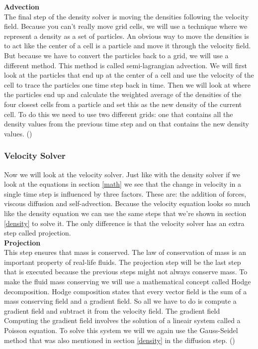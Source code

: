 \documentclass[a4paper,12pt]{article}
\begin{document}
\textbf{Advection }\\

The final step of the density solver is moving the densities following the velocity field.
Because you can't really move grid cells, we will use a technique where we represent a density as a set of particles.
An obvious way to move the densities is to act like the center of a cell is a particle and move it through the velocity field.
But because we have to convert the particles back to a grid, we will use a different method. 
This method is called semi-lagrangian advection.
We will first look at the particles that end up at the center of a cell and use the velocity of the cell to trace the particles one time step back in time.
Then we will look at where the particles end up and calculate the weighted average of the densities of the four closest cells from a particle and set this as the new density of the current cell. 
To do this we need to use two different grids: one that contains all the density values from the previous time step
and on that contains the new density values. (\cite{josstam})

 \subsubsection{Velocity Solver}
Now we will look at the velocity solver. Just like with the density solver if we look at the equations in section \ref{math}
we see that the change in velocity in a single time step is influenced by three factors. 
These are: the addition of forces, viscous diffusion and self-advection. 
Because the velocity equation looks so much like the density equation we can use the same steps that we're shown in section \ref{density} to solve it.
The only difference is that the velocity solver has an extra step called projection. \\

\textbf{Projection }\\

This step ensures that mass is conserved. 
The law of conservation of mass is an important property of real-life fluids.
The projection step will be the last step that is executed because the previous steps might not always conserve mass.
To make the fluid mass conserving we will use a mathematical concept called Hodge decomposition.
Hodge composition states that every vector field is the sum of a mass conserving field and a gradient field.
So all we have to do is compute a gradient field and subtract it from the velocity field. 
The gradient field 
Computing the gradient field involves the solution of a lineair system called a Poisson equation.
To solve this system we will we again use the Gauss-Seidel method that was also mentioned in section \ref{density} in the diffusion step. (\cite{josstam})
\end{document}
